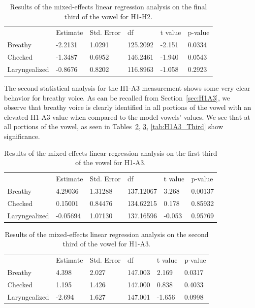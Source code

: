 \documentclass[12pt, letterpaper]{article}
\providecommand{\lsptoprule}{\midrule\toprule}
\providecommand{\lspbottomrule}{\bottomrule\midrule}
\begin{document}
\begin{table}[!h]
	\centering
	\caption{Results of the mixed-effects linear regression analysis on the final third of the vowel for H1-H2. }
	\label{tab:H1H2_Third}
	 \begin{tabular}{llllll}
	  \lsptoprule
						&  Estimate  & Std. Error & df & t value & p-value \\
	  	Breathy   		&  -2.2131  &   1.0291 & 125.2092 &  -2.151  &  0.0334 \\
		Checked    		&  -1.3487  &   0.6952 & 146.2461 &  -1.940  &  0.0543 \\
		Laryngealized	&  -0.8676  &   0.8202 & 116.8963 &  -1.058  &  0.2923 \\
	  \lspbottomrule
	 \end{tabular}
\end{table}

The second statistical analysis for the H1-A3 measurement shows some very clear behavior for breathy voice. As can be recalled from Section~\ref{sec:H1A3}, we observe that breathy voice is clearly identified in all portions of the vowel with an elevated H1-A3 value when compared to the model vowels' values. We see that at all portions of the vowel, as seen in Tables~\ref{tab:H1A3_First}, \ref{tab:H1A3_Second}, \ref{tab:H1A3_Third} show significance.  

\begin{table}[!h]
	\centering
	\caption{Results of the mixed-effects linear regression analysis on the first third of the vowel for H1-A3. }
	\label{tab:H1A3_First}
	 \begin{tabular}{llllll}
	  \lsptoprule
						&  Estimate  & Std. Error & df & t value & p-value \\
	  	Breathy   		&  4.29036  &  1.31288 & 137.12067 &  3.268  &  0.00137\\
		Checked    		&  0.15001  &  0.84476 & 134.62215 &  0.178  &  0.85932 \\
		Laryngealized	& -0.05694  &  1.07130 & 137.16596 & -0.053  &  0.95769\\
	  \lspbottomrule
	 \end{tabular}
\end{table}

\begin{table}[!h]
	\centering
	\caption{Results of the mixed-effects linear regression analysis on the second third of the vowel for H1-A3. }
	\label{tab:H1A3_Second}
	 \begin{tabular}{llllll}
	  \lsptoprule
						&  Estimate  & Std. Error & df & t value & p-value \\
	  	Breathy   		&  4.398    &  2.027 & 147.003 &  2.169 &  0.0317 \\
		Checked    		&  1.195    &  1.426 & 147.000 &  0.838 &  0.4033  \\
		Laryngealized	& -2.694    &  1.627 & 147.001 & -1.656 &  0.0998 \\
	  \lspbottomrule
	 \end{tabular}
\end{table}
\end{document}
